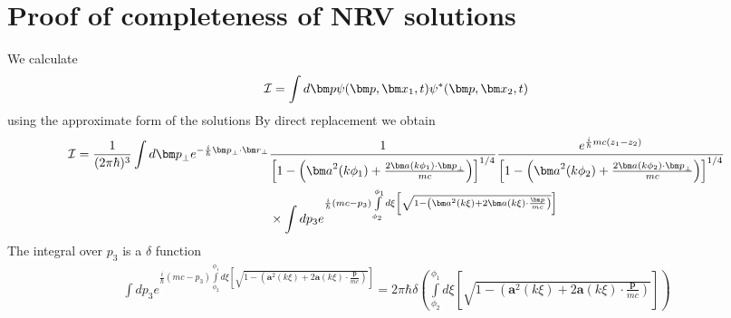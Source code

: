 \chapter{Proof of completeness of NRV solutions}


We calculate 
\begin{align} 
{\cal I}=\int d{\bm p}\psi({\bm p},{\bm x}_1,t)\psi^*({\bm p},{\bm x}_2,t)
\end{align}
using the approximate form of the solutions
By direct replacement we obtain 
\begin{align} 
{\cal I}=\frac1{(2\pi\hbar)^{3}}\int d{\bm p}_\perp e^{-\frac{i}{\hbar}{\bm p}_\perp\cdot{\bm r}_\perp}&\frac1{\left[1-\left({\bm a}^2(k\phi_1)+\frac{2{\bm a}(k\phi_1)\cdot{\bm p}_\perp}{mc}\right)\right]^{1/4}}\frac{e^{\frac{i}{\hbar}mc(z_1-z_2)}}{\left[1-\left({\bm a}^2(k\phi_2)+\frac{2{\bm a}(k\phi_2)\cdot{\bm p}_\perp}{mc}\right)\right]^{1/4}}\nonumber\\
&\times \int d p_3e^{\frac{i}{\hbar}(mc-p_3)\int\limits_{\phi_2}^{\phi_1}d\xi \left[\sqrt{1-\left({\bm a}^2(k\xi)+2{\bm a}(k\xi)\cdot\frac{\bm p}{mc}\right)}\right]}
\end{align}
The integral over $p_3$ is a $\delta$ function
\begin{align} 
    \int d p_3e^{\frac{i}{\hbar}(mc-p_3)\int\limits_{\phi_2}^{\phi_1}d\xi \left[\sqrt{1-\left({\bm a}^2(k\xi)+2{\bm a}(k\xi)\cdot\frac{\bm p}{mc}\right)}\right]}=2\pi\hbar\delta(\int\limits_{\phi_2}^{\phi_1}d\xi \left[\sqrt{1-\left({\bm a}^2(k\xi)+2{\bm a}(k\xi)\cdot\frac{\bm p}{mc}\right)}\right])
\end{align}
